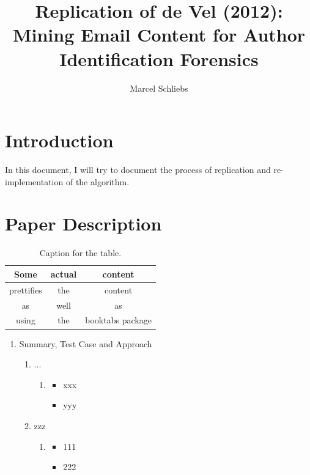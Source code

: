 \documentclass[a4paper,man,natbib]{apa6}
\title{Replication of de Vel (2012): Mining Email Content for Author Identification Forensics}
\author{Marcel Schliebs}
\affiliation{Studienstiftung natur- und ingenieurswissenschaftliches Forschungskolleg}
\begin{document}
\maketitle

\section{Introduction}

In this document, I will try to document the process of replication and re-implementation of the algorithm. 

\section{Paper Description}
\label{sec:Paper Description}


\begin{table}[h!]
	\centering
	\caption{Caption for the table.}
	\label{tab:table1}
	\begin{tabular}{ccc}
		\toprule
		Some & actual & content\\
		\midrule
		prettifies & the & content\\
		as & well & as\\
		using & the & booktabs package\\
		\bottomrule
	\end{tabular}
\end{table}


 \begin{enumerate}
	\item Summary, Test Case and Approach
		\begin{enumerate}
		\item ...
		\begin{enumerate}
			\item 
				\begin{itemize}
					\item xxx
					\item yyy
				\end{itemize}
		\end{enumerate}
			\item zzz
	\begin{enumerate}
		\item 
		\begin{itemize}
			\item 111
			\item 222
		\end{itemize}
	\end{enumerate}
\end{enumerate}
\end{enumerate}
\end{document}
